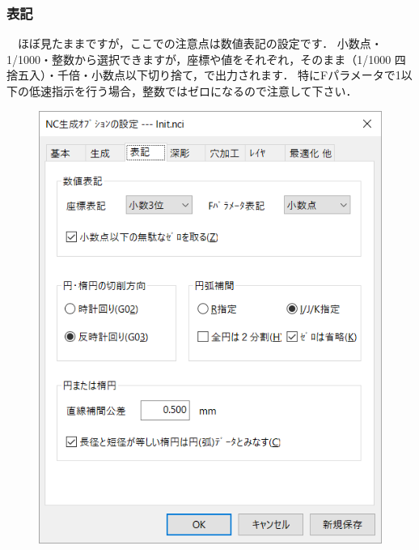 \subsubsection{表記}
\begin{minipage}[t]{0.5\textwidth}
　ほぼ見たままですが，ここでの注意点は数値表記の設定です．
小数点・1/1000・整数から選択できますが，座標や値をそれぞれ，そのまま（1/1000 四捨五入）・千倍・小数点以下切り捨て，で出力されます．
特にFパラメータで1以下の低速指示を行う場合，整数ではゼロになるので注意して下さい．
\end{minipage}
\begin{minipage}[t]{0.5\textwidth}
\vspace*{-2zh}
\begin{figure}[H]
\centering
\includegraphics[scale=0.7]{No6/fig/init3.png}
\label{fig:init3.png}
\end{figure}
\end{minipage}

